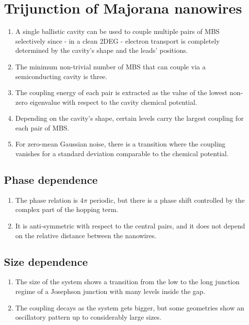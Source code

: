 \chapter{Trijunction of Majorana nanowires}

\begin{enumerate}
\item A single ballistic cavity can be used to couple multiple pairs of MBS selectively since - in a clean 2DEG - electron transport is completely determined by the cavity's shape and the leads' positions.
\item The minimum non-trivial number of MBS that can couple via a semiconducting cavity is three.
\item The coupling energy of each pair is extracted as the value of the lowest non-zero eigenvalue with respect to the cavity chemical potential.
\item Depending on the cavity's shape, certain levels carry the largest coupling for each pair of MBS.
\item For zero-mean Gaussian noise, there is a transition where the coupling vanishes for a standard deviation comparable to the chemical potential.
\end{enumerate}

\section{Phase dependence}
\begin{enumerate}
\item The phase relation is $4\pi$ periodic, but there is a phase shift controlled by the complex part of the hopping term.
\item It is anti-symmetric with respect to the central pairs, and it does not depend on the relative distance between the nanowires.
\end{enumerate}

\section{Size dependence}
\begin{enumerate}
\item The size of the system shows a transition from the low to the long junction regime of a Josephson junction with many levels inside the gap.
\item The coupling decays as the system gets bigger, but some geometries show an oscillatory pattern up to considerably large sizes.
\end{enumerate}


